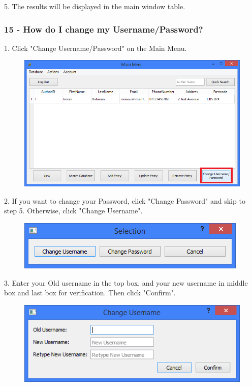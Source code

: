 5. The results will be displayed in the main window table.

\subsubsection{15 - How do I change my Username/Password?} \label{sssec:Q15}

1. Click "Change Username/Password" on the Main Menu.

\begin{figure}[H]
    \includegraphics[width=\textwidth]{./Manual/Tutorial/Q15/ChangeUsernameOrPassword.png}
\end{figure}

2. If you want to change your Password, click "Change Password" and skip to step 5. Otherwise, click "Change Username".

\begin{figure}[H]
    \includegraphics[width=\textwidth]{./Manual/Tutorial/Q15/Selection.png}
\end{figure}

3. Enter your Old username in the top box, and your new username in middle box and last box for verification. Then click "Confirm".

\begin{figure}[H]
    \includegraphics[width=\textwidth]{./Manual/Tutorial/Q15/ChangeUsername.png}
\end{figure}

